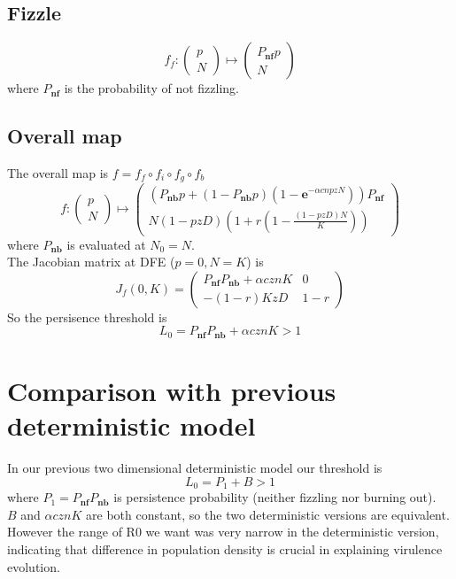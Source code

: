 \documentclass[12pt]{article}
\begin{document}
\subsection{Fizzle}
$$f_f:\begin{pmatrix}
    p\\N
\end{pmatrix}
\mapsto \begin{pmatrix}
    P_\textbf{nf}p\\
    N
\end{pmatrix}$$
where $P_\textbf{nf}$ is the probability of not fizzling.

\subsection{Overall map}
The overall map is $f=f_f \circ f_i \circ f_g \circ f_b$
$$f:\begin{pmatrix}
    p\\N
\end{pmatrix}
\mapsto \begin{pmatrix}
    (P_\textbf{nb}p+(1-P_\textbf{nb}p)(1-\mathbf{e}^{-\alpha cnpzN}))P_\textbf{nf}\\
    N(1-pzD)(1+r(1-\frac{(1-pzD)N}{K}))
\end{pmatrix}$$
where $P_\textbf{nb}$ is evaluated at $N_0=N$.\\

The Jacobian matrix at DFE ($p=0,N=K$) is
$$J_{f}(0,K)=\begin{pmatrix}
    P_\textbf{nf}P_\textbf{nb}+\alpha cznK&0\\-(1-r)KzD&1-r
\end{pmatrix}$$
So the persisence threshold is
$$L_0=  P_\textbf{nf}P_\textbf{nb}+\alpha cznK>1$$

\section{Comparison with previous deterministic model}
In our previous two dimensional deterministic model our threshold is
$$L_0=  P_1+B>1$$ where $P_1=P_\textbf{nf}P_\textbf{nb}$ is persistence probability (neither fizzling nor burning out).\\

$B$ and  $\alpha cznK$ are both constant, so the two deterministic versions are equivalent. However the range of R0 we want was very narrow in the deterministic version, indicating that difference in population density is crucial in explaining virulence evolution.
\end{document}
